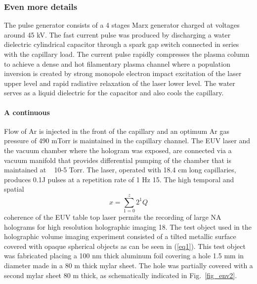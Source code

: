 \documentclass[]{IEEEphot}
\begin{document}
\subsubsection{Even more details}

 The pulse generator consists of a 4 stages Marx generator charged at voltages around 45 kV. The fast current pulse was produced by discharging a water dielectric cylindrical capacitor through a spark gap switch connected in series with the capillary load. The current pulse rapidly compresses the plasma column to achieve a dense and hot filamentary plasma channel where a population inversion is created by strong monopole electron impact excitation of the laser upper level and rapid radiative relaxation of the laser lower level. The water serves as a liquid dielectric for the capacitor and also cools the capillary.  


\paragraph{A continuous} Flow of Ar is injected in the front of the capillary and an optimum Ar gas pressure of 490 mTorr is maintained in the capillary channel. The EUV laser and the vacuum chamber where the hologram was exposed, are connected via a vacuum manifold that provides differential pumping of the chamber that is maintained at ~ 10-5 Torr. The laser, operated with 18.4 cm long capillaries, produces 0.1J pulses at a repetition rate of 1 Hz 15. The high temporal and spatial  
\begin{equation}
x=\sum\limits_{1=0}^z 2^1Q
\label{eq1}
\end{equation}%
coherence of the EUV table top laser permits the recording of large NA holograms for high resolution holographic imaging 18. The test object used in the holographic volume imaging experiment consisted of a tilted metallic surface covered with opaque spherical objects as can be seen in (\ref{eq1}). This test object was fabricated placing a 100 nm thick aluminum foil covering a hole 1.5 mm in diameter made in a 80 m thick mylar sheet. The hole was partially covered with a second mylar sheet 80 m thick, as schematically indicated in Fig.~\ref{fig_env2}.
\end{document}
